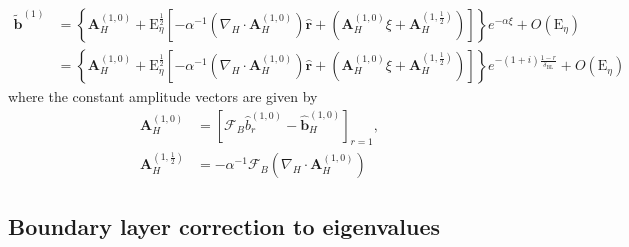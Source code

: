 \begin{mdframed}[style=HighlightBox, frametitle={Magnetic boundary layer solution up to $E_\eta^{1/2}$}]
\begin{equation}
\begin{aligned}
    \widetilde{\mathbf{b}}^{(1)} &= \left\{\mathbf{A}_H^{(1,0)} + \mathrm{E}_\eta^{\frac{1}{2}} \left[-\alpha^{-1} \left(\nabla_H\cdot \mathbf{A}_H^{(1,0)}\right) \hat{\mathbf{r}} + \left(\mathbf{A}_H^{(1,0)}\xi + \mathbf{A}_H^{(1,\frac{1}{2})}\right)\right]\right\} e^{-\alpha \xi} + O\left(\mathrm{E}_\eta\right) \\ 
    &= \left\{\mathbf{A}_H^{(1,0)} + \mathrm{E}_\eta^{\frac{1}{2}} \left[-\alpha^{-1} \left(\nabla_H\cdot \mathbf{A}_H^{(1,0)}\right) \hat{\mathbf{r}} + \left(\mathbf{A}_H^{(1,0)}\xi + \mathbf{A}_H^{(1,\frac{1}{2})}\right)\right]\right\} e^{-(1 + i)\frac{1 - r}{\delta_\mathrm{BL}}} + O\left(\mathrm{E}_\eta\right)
\end{aligned}
\end{equation}
where the constant amplitude vectors are given by
\begin{equation}
\begin{aligned}
    \mathbf{A}_H^{(1,0)} &= \left[\mathcal{F}_B \widehat{b}_r^{(1,0)} - \widehat{\mathbf{b}}_H^{(1,0)}\right]_{r=1}, \\
    \mathbf{A}_H^{(1,\frac{1}{2})} &= - \alpha^{-1} \mathcal{F}_B \left(\nabla_H\cdot \mathbf{A}_H^{(1,0)}\right)
\end{aligned}
\end{equation}
\end{mdframed}


\subsection{Boundary layer correction to eigenvalues}

